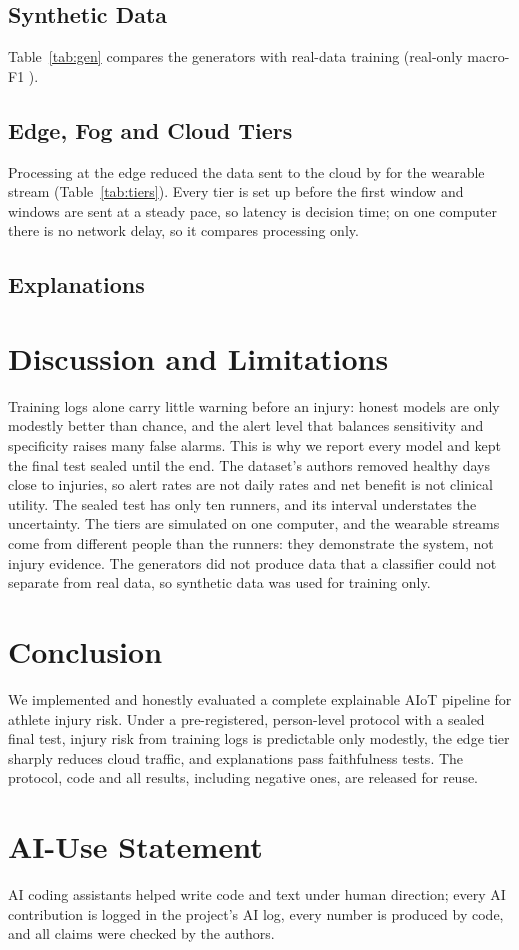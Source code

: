 \documentclass{ieeeaccess}
\begin{document}
\subsection{Synthetic Data}

Table~\ref{tab:gen} compares the generators with real-data training (real-only macro-F1
\pamapRealFone{}). \wesadSummary{} \augmentSummary{}

\subsection{Edge, Fog and Cloud Tiers}

Processing at the edge reduced the data sent to the cloud by \tiersReduction{} for the wearable
stream (Table~\ref{tab:tiers}). Every tier is set up before the first window and windows are
sent at a steady pace, so latency is decision time; on one computer there is no network delay,
so it compares processing only.

\subsection{Explanations}
\explainSummary{}

\section{Discussion and Limitations}
Training logs alone carry little warning before an injury: honest models are only modestly
better than chance, and the alert level that balances sensitivity and specificity raises many
false alarms. This is why we report every model and kept the final test sealed until the end.
The dataset's authors removed healthy days close to injuries, so alert rates are not daily rates
and net benefit is not clinical utility. The sealed test has only ten runners, and its interval
understates the uncertainty. The tiers are simulated on one computer, and the wearable streams
come from different people than the runners: they demonstrate the system, not injury evidence.
The generators did not produce data that a classifier could not separate from real data, so
synthetic data was used for training only.

\section{Conclusion}
We implemented and honestly evaluated a complete explainable AIoT pipeline for athlete injury
risk. Under a pre-registered, person-level protocol with a sealed final test, injury risk from
training logs is predictable only modestly, the edge tier sharply reduces cloud traffic, and
explanations pass faithfulness tests. The protocol, code and all results, including negative
ones, are released for reuse.

\section*{AI-Use Statement}
AI coding assistants helped write code and text under human direction; every AI contribution is
logged in the project's AI log, every number is produced by code, and all claims were checked by
the authors.




\EOD
\end{document}
